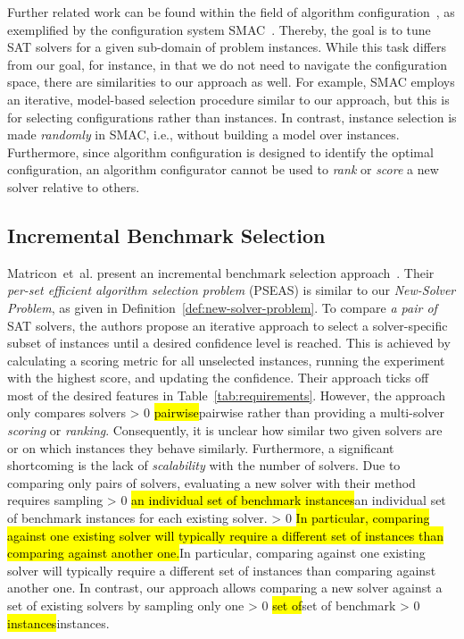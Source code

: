 \documentclass[sn-basic, Numbered]{sn-jnl} %
\newcommand{\showchanges}{1} %
\newcommand{\change}[1]{\ifnum \showchanges > 0 \sethlcolor{yellow}\hl{#1}\else#1\fi}
\begin{document}
Further related work can be found within the field of algorithm configuration~\cite{HoosHL21,Stutzle0P22}, as exemplified by the configuration system SMAC~\cite{HutterHL11}.
Thereby, the goal is to tune SAT solvers for a given sub-domain of problem instances.
While this task differs from our goal, for instance, in that we do not need to navigate the configuration space, there are similarities to our approach as well.
For example, SMAC employs an iterative, model-based selection procedure similar to our approach, but this is for selecting configurations rather than instances.
In contrast, instance selection is made \emph{randomly} in SMAC, i.e., without building a model over instances.
Furthermore, since algorithm configuration is designed to identify the optimal configuration, an algorithm configurator cannot be used to \emph{rank} or \emph{score} a new solver relative to others.

\subsection{Incremental Benchmark Selection}
\label{sec:related:incremental-selection}

Matricon~et~al. present an incremental benchmark selection approach~\cite{MatriconAFSH21}.
Their \emph{per-set efficient algorithm selection problem} (PSEAS) is similar to our \emph{New-Solver Problem}, as given in Definition~\ref{def:new-solver-problem}.
To compare \emph{a pair of} SAT solvers, the authors propose an iterative approach to select a solver-specific subset of instances until a desired confidence level is reached.
This is achieved by calculating a scoring metric for all unselected instances, running the experiment with the highest score, and updating the confidence.
Their approach ticks off most of the desired features in Table~\ref{tab:requirements}.
However, the approach only compares solvers \change{pairwise} rather than providing a multi-solver \emph{scoring} or \emph{ranking}.
Consequently, it is unclear how similar two given solvers are or on which instances they behave similarly.
Furthermore, a significant shortcoming is the lack of \emph{scalability} with the number of solvers.
Due to comparing only pairs of solvers, evaluating a new solver with their method requires sampling \change{an individual set of benchmark instances} for each existing solver.
\change{In particular, comparing against one existing solver will typically require a different set of instances than comparing against another one.}
In contrast, our approach allows comparing a new solver against a set of existing solvers by sampling only one \change{set of} benchmark \change{instances}.
\end{document}
